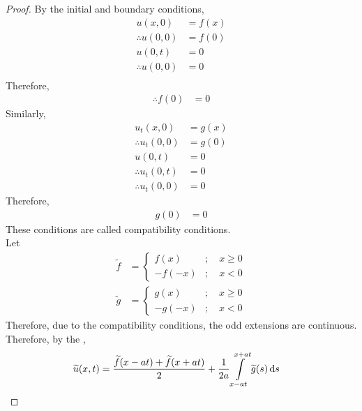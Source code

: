 \documentclass[titlepage, fleqn, a4paper, 12pt, twoside]{article}
\theoremstyle{definition}
\theoremstyle{theorem}
\renewcommand{\tilde}{\widetilde}
\begin{document}
\begin{proof}
	By the initial and boundary conditions,
	\begin{align*}
		u(x,0)            & = f(x) \\
		\therefore u(0,0) & = f(0) \\
		u(0,t)            & = 0    \\
		\therefore u(0,0) & = 0    \\
	\end{align*}
	Therefore,
	\begin{align*}
		\therefore f(0) & = 0
	\end{align*}
	Similarly,
	\begin{align*}
		u_t(x,0)            & = g(x) \\
		\therefore u_t(0,0) & = g(0) \\
		u(0,t)              & = 0    \\
		\therefore u_t(0,t) & = 0    \\
		\therefore u_t(0,0) & = 0
	\end{align*}
	Therefore,
	\begin{align*}
		g(0) & = 0
	\end{align*}
	These conditions are called compatibility conditions.\\
	Let
	\begin{align*}
		\tilde{f} &=
			\begin{cases}
				f(x)   & ;\quad x \ge 0 \\
				-f(-x) & ;\quad x < 0
			\end{cases}\\
		\tilde{g} &=
			\begin{cases}
				g(x)   & ;\quad x \ge 0 \\
				-g(-x) & ;\quad x < 0
			\end{cases}
	\end{align*}
	Therefore, due to the compatibility conditions, the odd extensions are continuous.\\
	Therefore, by the ,
	\begin{align*}
		\tilde{u}(x,t) & = \frac{\tilde{f}(x - a t) + \tilde{f}(x + a t)}{2} + \frac{1}{2 a} \int\limits_{x - a t}^{x + a t} \tilde{g}(s) \dif s
	\end{align*}
\end{proof}
\end{document}
